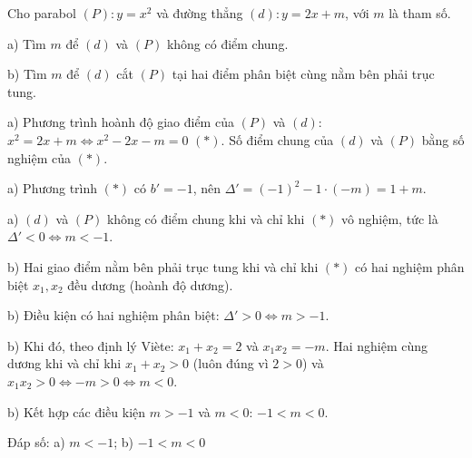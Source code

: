 \begin{problem}[9DS-HSB2-007]
Cho parabol $(P)\colon y = x^2$ và đường thẳng $(d)\colon y = 2x + m$, với $m$ là tham số.

a) Tìm $m$ để $(d)$ và $(P)$ không có điểm chung.

b) Tìm $m$ để $(d)$ cắt $(P)$ tại hai điểm phân biệt cùng nằm bên phải trục tung.

\begin{solution}
a) Phương trình hoành độ giao điểm của $(P)$ và $(d)$: $x^2 = 2x + m \Leftrightarrow x^2 - 2x - m = 0$ $(*)$. Số điểm chung của $(d)$ và $(P)$ bằng số nghiệm của $(*)$.

a) Phương trình $(*)$ có $b' = -1$, nên $\Delta' = (-1)^2 - 1 \cdot (-m) = 1 + m$.

a) $(d)$ và $(P)$ không có điểm chung khi và chỉ khi $(*)$ vô nghiệm, tức là $\Delta' < 0 \Leftrightarrow m < -1$.

b) Hai giao điểm nằm bên phải trục tung khi và chỉ khi $(*)$ có hai nghiệm phân biệt $x_1, x_2$ đều dương (hoành độ dương).

b) Điều kiện có hai nghiệm phân biệt: $\Delta' > 0 \Leftrightarrow m > -1$.

b) Khi đó, theo định lý Viète: $x_1 + x_2 = 2$ và $x_1 x_2 = -m$. Hai nghiệm cùng dương khi và chỉ khi $x_1 + x_2 > 0$ (luôn đúng vì $2 > 0$) và $x_1 x_2 > 0 \Leftrightarrow -m > 0 \Leftrightarrow m < 0$.

b) Kết hợp các điều kiện $m > -1$ và $m < 0$: $-1 < m < 0$.

Đáp số: a) $\boxed{m < -1}$; b) $\boxed{-1 < m < 0}$
\end{solution}
\end{problem}

